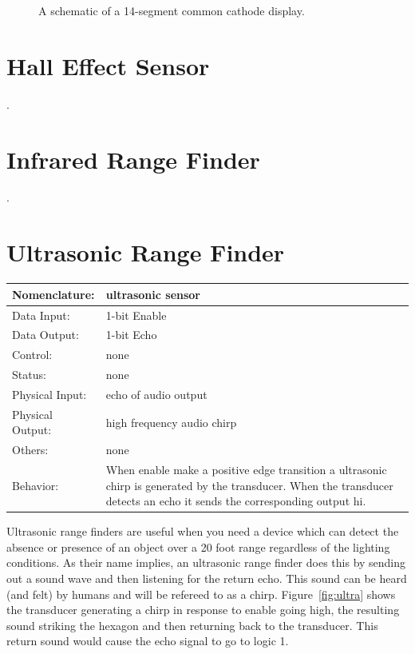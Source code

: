 \begin{figure}[ht]
\caption{A schematic of a 14-segment common cathode display.}
\label{fig:common}
\end{figure}


\section{Hall Effect Sensor}
\pagebreak
.

\section{Infrared Range Finder}
\pagebreak
.

\section{Ultrasonic Range Finder}
\label{page:ultrasonic}
\begin{tabular}{|l|p{3.5in}|} \hline
Nomenclature:  & ultrasonic sensor  \\ \hline
Data Input:    & 1-bit Enable     \\ \hline
Data Output:   & 1-bit Echo   \\ \hline
Control:       & none           \\ \hline
Status:        & none                                   \\ \hline
Physical Input:& echo of audio output		\\ \hline
Physical Output:& high frequency audio chirp		\\ \hline
Others:        & none                   \\ \hline
Behavior:      & When enable make a positive edge transition
a ultrasonic chirp is generated by the transducer.  When the 
transducer detects an echo it sends the corresponding output hi. \\ \hline
\end{tabular}

Ultrasonic range finders are useful when you need a device which
can detect the absence or presence of an object over a 20 foot
range regardless of the lighting conditions.   As their name implies, 
an ultrasonic range finder does this by sending out a sound wave
and then listening for the return echo.  This sound can be heard (and
felt) by humans and will be refereed to as a chirp.
Figure~\ref{fig:ultra} shows the transducer generating a chirp in
response to enable going high, the resulting sound striking the 
hexagon and then returning back to the transducer.  This return
sound would cause the echo signal to go to logic 1.

